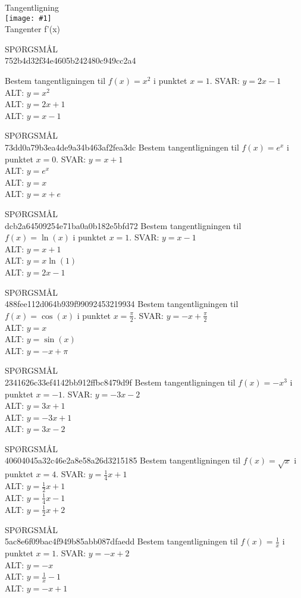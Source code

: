 \documentclass[]{article}
\newcounter{spgcounter}
\newenvironment{question}[2]{\addtocounter{spgcounter}{1} SPØRGSMÅL \thespgcounter\\}{\hspace{50px}}
\newcommand{\name}[1]{{\huge #1}\\}
\newcommand{\tag}[1]{#1}
\newcommand{\cover}[1]{\texttt{[image: \#1]}\\}
\newcommand{\answer}[1]{{\color{green} SVAR: #1}\\}
\newcommand{\alt}[1]{{\color{red} ALT: #1}\\}
\begin{document}
\name{Tangentligning}
\cover{tangentligning.png}
\tag{Tangenter}
\tag{f'(x)}
\begin{question}{multi}\id{752b4d32f34e4605b242480c949cc2a4}

    Bestem tangentligningen til $f(x) = x^2$ i punktet $x = 1$.
    \answer{$y = 2x - 1$}
    \alt{$y = x^2$}
    \alt{$y = 2x + 1$}
    \alt{$y = x - 1$}
    \end{question}
    
    \begin{question}{multi}\id{73dd0a79b3ea4de9a34b463af2fea3dc}
    Bestem tangentligningen til $f(x) = e^x$ i punktet $x = 0$.
    \answer{$y = x + 1$}
    \alt{$y = e^x$}
    \alt{$y = x$}
    \alt{$y = x + e$}
    \end{question}
    
    \begin{question}{multi}\id{dcb2a64509254e71ba0a0b182e5bfd72}
    Bestem tangentligningen til $f(x) = \ln(x)$ i punktet $x = 1$.
    \answer{$y = x - 1$}
    \alt{$y = x + 1$}
    \alt{$y = x \ln(1)$}
    \alt{$y = 2x - 1$}
    \end{question}
    
    \begin{question}{multi}\id{488fee112d064b939f99092453219934}
    Bestem tangentligningen til $f(x) = \cos(x)$ i punktet $x = \frac{\pi}{2}$.
    \answer{$y = -x + \frac{\pi}{2}$}
    \alt{$y = x$}
    \alt{$y = \sin(x)$}
    \alt{$y = -x + \pi$}
    \end{question}
    
    \begin{question}{multi}\id{2341626c33ef4142bb912ffbc8479d9f}
    Bestem tangentligningen til $f(x) = -x^3$ i punktet $x = -1$.
    \answer{$y = -3x - 2$}
    \alt{$y = 3x + 1$}
    \alt{$y = -3x + 1$}
    \alt{$y = 3x - 2$}
    \end{question}
    
    \begin{question}{multi}\id{40604045a32c46e2a8e58a26d3215185}
    Bestem tangentligningen til $f(x) = \sqrt{x}$ i punktet $x = 4$.
    \answer{$y = \frac{1}{4}x + 1$}
    \alt{$y = \frac{1}{2}x + 1$}
    \alt{$y = \frac{1}{4}x - 1$}
    \alt{$y = \frac{1}{2}x + 2$}
    \end{question}
        
    \begin{question}{multi}\id{5ac8e6f09bac4f949b85abb087dfaedd}
    Bestem tangentligningen til $f(x) = \frac{1}{x}$ i punktet $x = 1$.
    \answer{$y = -x + 2$}
    \alt{$y = -x$}
    \alt{$y = \frac{1}{x} - 1$}
    \alt{$y = -x + 1$}
    \end{question}
    
\end{document}
